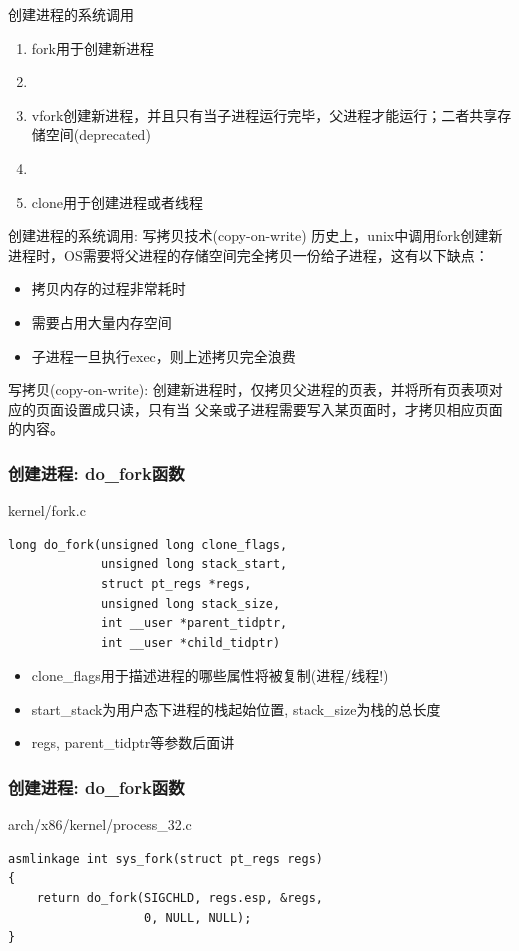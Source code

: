 \documentclass[xcolor=svgnames]{beamer}
\begin{document}
\begin{CJK*}{UTF8}{gbsn}
\begin{frame}{创建进程的系统调用}
\begin{enumerate}
\item fork用于创建新进程
\item[]
\item vfork创建新进程，并且只有当子进程运行完毕，父进程才能运行；二者共享存储空间(deprecated)
\item[]
\item clone用于创建进程或者线程

\end{enumerate}
\end{frame}

\begin{frame}{创建进程的系统调用: 写拷贝技术(copy-on-write)}
历史上，unix中调用fork创建新进程时，OS需要将父进程的存储空间完全拷贝一份给子进程，这有以下缺点：
\begin{itemize}
\item 拷贝内存的过程非常耗时
\item 需要占用大量内存空间
\item 子进程一旦执行exec，则上述拷贝完全浪费
\end{itemize}

写拷贝(copy-on-write): 创建新进程时，仅拷贝父进程的页表，并将所有页表项对应的页面设置成只读，只有当
父亲或子进程需要写入某页面时，才拷贝相应页面的内容。
\end{frame}

\begin{frame}[fragile]
\frametitle{创建进程: do\_fork函数}
\begin{block}{kernel/fork.c}
\begin{verbatim}
long do_fork(unsigned long clone_flags,
             unsigned long stack_start,
             struct pt_regs *regs,
             unsigned long stack_size,
             int __user *parent_tidptr,
             int __user *child_tidptr)
\end{verbatim}
\end{block}
\begin{itemize}
\item clone\_flags用于描述进程的哪些属性将被复制(进程/线程!)
\item start\_stack为用户态下进程的栈起始位置, stack\_size为栈的总长度
\item regs, parent\_tidptr等参数后面讲
\end{itemize}
\end{frame}

\begin{frame}[fragile]
\frametitle{创建进程: do\_fork函数}
\begin{block}{arch/x86/kernel/process\_32.c}
\begin{verbatim}
asmlinkage int sys_fork(struct pt_regs regs)
{
    return do_fork(SIGCHLD, regs.esp, &regs, 
                   0, NULL, NULL);
}
\end{verbatim}
\end{block}
\end{frame}


\end{CJK*}
\end{document}
